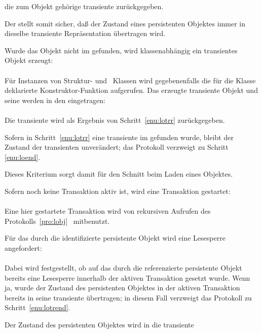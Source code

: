 \begin{infol}
\begin{block}
\begin{block}
die zum Objekt geh\"{o}rige transiente \representation{} zur\"{u}ckgegeben.
\par{}Der \cache\/ stellt somit sicher, da\ss{} der Zustand eines
persistenten Objektes immer in dieselbe transiente Repr\"{a}sentation
\"{u}bertragen wird.
%
\item Wurde das Objekt nicht im \cache\/ gefunden, wird
klassenabh\"{a}ngig ein transientes Objekt erzeugt:\\
\\
F\"{u}r Instanzen von Struktur- und \clos\ Klassen wird gegebenenfalls die
f\"{u}r die Klasse deklarierte Konstruktor-Funktion aufgerufen.
Das erzeugte transiente Objekt und seine \sobjid\/ werden in den
\cache\/ eingetragen:\\
\\
Die transiente \representation{} wird als Ergebnis von
Schritt~\ref{enu:lotrr} zur\"{u}ckgegeben.
%
\end{block}%
%
\item\label{enu:locut} Sofern in Schritt~\ref{enu:lotrr} eine
transiente \representation{} im \cache\/ gefunden wurde, bleibt der
Zustand der transienten \representation{} unver\"{a}ndert; das Protokoll
verzweigt zu Schritt \ref{enu:loend}.
\par{}Dieses Kriterium sorgt damit f\"{u}r den Schnitt beim Laden eines
Objektes.
%
\item\label{enu:lotrbeg} Sofern noch keine Transaktion aktiv ist, wird
eine Transaktion gestartet:\\
\\
Eine hier gestartete Transaktion wird von rekursiven Aufrufen des
Protokolls~\ref{pro:lobj} \ mitbenutzt.
%
\item\label{enu:lowrl} F\"{u}r das durch die \sobjid\/ identifizierte
persistente Objekt wird eine Lesesperre angefordert:\\
\\
Dabei wird festgestellt, ob auf das durch die \sobjid\/ referenzierte
persistente Objekt bereits eine Lesesperre innerhalb der
aktiven Transaktion gesetzt wurde. Wenn ja, wurde der Zustand des
persistenten Objektes in der aktiven Transaktion bereits in seine
transiente \representation{} \"{u}ber\-tra\-gen; in diesem Fall verzweigt
das Protokoll zu Schritt~\ref{enu:lotrend}.
%
\item Der Zustand des persistenten Objektes wird in die transiente

\end{block}
\end{infol}
